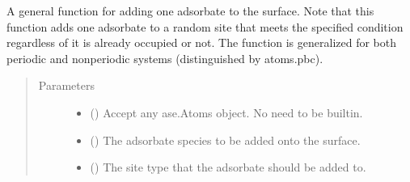 \documentclass[letterpaper,10pt,english]{sphinxmanual}
\begin{document}
\begin{fulllineitems}
\label{\detokenize{build:acat.build.actions.add_adsorbate}}
A general function for adding one adsorbate to the surface.
Note that this function adds one adsorbate to a random site
that meets the specified condition regardless of it is already
occupied or not. The function is generalized for both periodic
and non\sphinxhyphen{}periodic systems (distinguished by atoms.pbc).
\begin{quote}\begin{description}
\item[{Parameters}] \leavevmode\begin{itemize}
\item {} 
 () \textendash{} Accept any ase.Atoms object. No need to be built\sphinxhyphen{}in.

\item {} 
 () \textendash{} The adsorbate species to be added onto the surface.

\item {} 
 (\sphinxstyleliteralemphasis{\sphinxupquote{, }}) \textendash{} The site type that the adsorbate should be added to.


\end{itemize}
\end{description}
\end{quote}
\end{fulllineitems}
\end{document}
